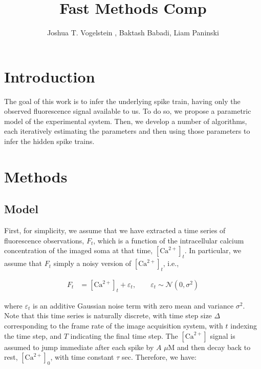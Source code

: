 \documentclass[12pt]{article}
\title{Fast Methods Comp}
\author{Joshua T. Vogelstein%
, Baktash Babadi, Liam Paninski
}
\newcommand{\Ca}{[\text{Ca}^{2+}]}
\begin{document}
\maketitle %
\tableofcontents

\begin{abstract}

\end{abstract}

\section{Introduction}

The goal of this work is to infer the underlying spike train, having only the observed fluorescence signal available to us.  To do so, we propose a parametric model of the experimental system.  Then, we develop a number of algorithms, each iteratively estimating the parameters and then using those parameters to infer the hidden spike trains.

\section{Methods}
\subsection{Model}

First, for simplicity, we assume that we have extracted a time series of fluorescence observations, $F_t$, which is a function of the intracellular calcium concentration of the imaged soma at that time, $\Ca_t$.  In particular, we assume that $F_t$ simply a noisy version of $\Ca_t$, i.e.,

\begin{align} \label{eq:F}
F_t &=  \Ca_t + \varepsilon_t, \qquad \varepsilon_t \sim \mathcal{N}(0,\sigma^2)
\end{align}

\noindent where $\varepsilon_t$ is an additive Gaussian noise term with zero mean and variance $\sigma^2$. Note that this time series is naturally discrete, with time step size $\Delta$ corresponding to the frame rate of the image acquisition system, with $t$ indexing the time step, and $T$ indicating the final time step. The $\Ca$ signal is assumed to jump immediate after each spike by $A$ $\mu$M and then decay back to rest, $\Ca_0$, with time constant $\tau$ sec.  Therefore, we have:
\end{document}
